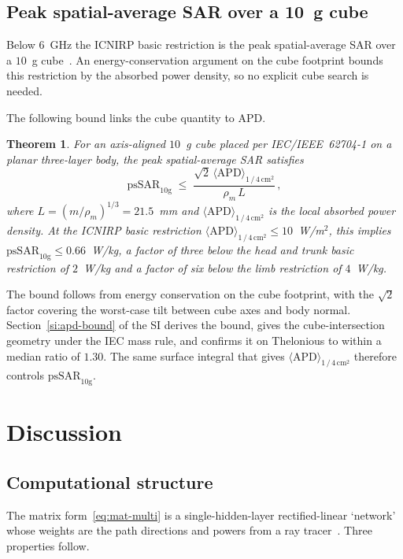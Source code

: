 \documentclass[journal,twocolumn,10pt]{IEEEtran}
\theoremstyle{plain}
\newtheorem{theorem}{Theorem}
\newcommand{\APDAvg}{\langle\mathrm{APD}\rangle_{1\,/\,4\,\mathrm{cm}^2}}
\begin{document}
\subsection{Peak spatial-average SAR over a 10~g cube}\label{subsec:compl-cube}

Below $6$~GHz the ICNIRP basic restriction is the peak spatial-average
SAR over a $10$~g cube~\cite{ICNIRP2020,62704-1}. An
energy-conservation argument on the cube footprint bounds this
restriction by the absorbed power density, so no explicit cube search
is needed.

The following bound links the cube quantity to APD.
\begin{theorem}\label{thm:apd-bound}
For an axis-aligned $10$~g cube placed per IEC/IEEE~62704-1 on a planar
three-layer body, the peak spatial-average SAR satisfies
\begin{equation}\label{eq:apd-bound}
  \mathrm{psSAR}_{10\mathrm{g}}
  \;\le\; \frac{\sqrt{2}\,\APDAvg}{\rho_m\,L}\, ,
\end{equation}
where $L = (m/\rho_m)^{1/3} = 21.5$~mm and $\APDAvg$ is the local
absorbed power density. At the ICNIRP basic restriction
$\APDAvg \le 10$~W/m$^2$, this implies
$\mathrm{psSAR}_{10\mathrm{g}} \le 0.66$~W/kg, a factor of three below
the head and trunk basic restriction of $2$~W/kg and a factor of six
below the limb restriction of $4$~W/kg.
\end{theorem}

The bound follows from energy conservation on the cube footprint,
with the $\sqrt{2}$ factor covering the worst-case tilt between cube
axes and body normal. Section~\ref{si:apd-bound} of the SI derives the bound,
gives the cube-intersection geometry under the IEC mass rule, and
confirms it on Thelonious to within a median ratio of $1.30$. The same
surface integral that gives $\APDAvg$ therefore controls
$\mathrm{psSAR}_{10\mathrm{g}}$.

\section{Discussion}\label{sec:disc}

\subsection{Computational structure}\label{subsec:disc-primitives}

The matrix form~\eqref{eq:mat-multi} is a single-hidden-layer
rectified-linear `network' whose weights are the path directions and
powers from a ray tracer~\cite{SionnaRT}. Three properties follow.
\end{document}

